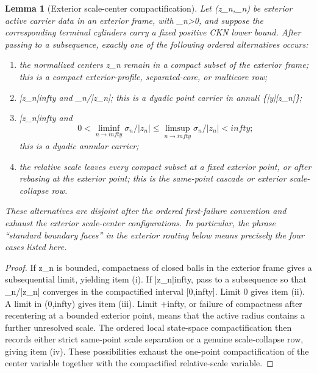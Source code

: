 \documentclass[11pt]{amsart}
\def\({}%
\def\){}%
\def\infty{infty}%
\theoremstyle{plain}
\newtheorem{lemma}[lemma]{Lemma}
\theoremstyle{definition}
\theoremstyle{remark}
\begin{document}
\begin{lemma}[Exterior scale-center compactification]
\label{paper8:lem:exterior-scale-center-compactification}
Let \((z_n,\sigma_n)\) be exterior active carrier data in an exterior frame,
with \(\sigma_n>0\), and suppose the corresponding terminal cylinders carry a
fixed positive CKN lower bound.  After passing to a subsequence, exactly one of
the following ordered alternatives occurs:
\begin{enumerate}[label=\textup{(\roman*)}]
\item the normalized centers \(z_n\) remain in a compact subset of the exterior
frame; this is a compact exterior-profile, separated-core, or multicore row;
\item \(|z_n|\to\infty\) and \(\sigma_n/|z_n|\); this is a dyadic point
carrier in annuli \(\{|y|\simeq |z_n|\}\);
\item \(|z_n|\to\infty\) and
\[
  0<\liminf_{n\to\infty}\sigma_n/|z_n|
  \le
  \limsup_{n\to\infty}\sigma_n/|z_n|<\infty;
\]
this is a dyadic annular carrier;
\item the relative scale leaves every compact subset at a fixed exterior
point, or after rebasing at the exterior point; this is the same-point cascade
or exterior scale-collapse row.
\end{enumerate}
These alternatives are disjoint after the ordered first-failure convention and
exhaust the exterior scale-center configurations.  In particular, the phrase
``standard boundary faces'' in the exterior routing below means precisely the
four cases listed here.
\end{lemma}

\begin{proof}
If \(z_n\) is bounded, compactness of closed balls in the exterior frame gives a
subsequential limit, yielding item \textup{(i)}.  If \(|z_n|\to\infty\), pass to
a subsequence so that \(\sigma_n/|z_n|\) converges in the compactified interval
\([0,\infty]\).  Limit \(0\) gives item \textup{(ii)}.  A limit in
\((0,\infty)\) gives item \textup{(iii)}.  Limit \(+\infty\), or failure of
compactness after recentering at a bounded exterior point, means that the
active radius contains a further unresolved scale.  The ordered local
state-space compactification then records either strict same-point scale
separation or a genuine scale-collapse row, giving item \textup{(iv)}.  These
possibilities exhaust the one-point compactification of the center variable
together with the compactified relative-scale variable.
\end{proof}
\end{document}
